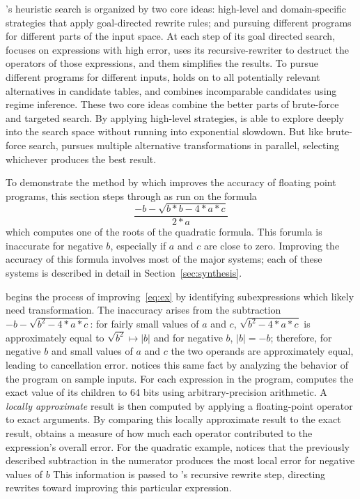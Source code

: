 \documentclass[paper.tex]{subfiles}
\begin{document}
\casio's heuristic search is organized by two core ideas: high-level
and domain-specific strategies that apply goal-directed rewrite rules;
and pursuing different programs for different parts of the input
space.  At each step of its goal directed search, \casio focuses on
expressions with high error, uses its recursive-rewriter to destruct
the operators of those expressions, and them simplifies the results.
To pursue different programs for different inputs, \casio holds on to
all potentially relevant alternatives in candidate tables, and combines
incomparable candidates using regime inference.  These two core ideas
combine the better parts of brute-force and targeted search.  By
applying high-level strategies, \casio is able to explore deeply into
the search space without running into exponential slowdown.  But like
brute-force search, \casio pursues multiple alternative
transformations in parallel, selecting whichever produces the best
result.

To demonstrate the method by which
  \casio improves the accuracy of floating point programs,
  this section steps through \casio as run on the formula
\begin{equation}\label{eq:ex}
  \frac{-b - \sqrt{b*b - 4*a*c}}
       {2*a}
\end{equation}
  which computes one of the roots of the quadratic formula.
This forumla is inaccurate for negative $b$,
  especially if $a$ and $c$ are close to zero.
Improving the accuracy of this formula
  involves most of the major systems;
  each of these systems is described in detail
  in Section~\ref{sec:synthesis}.

\casio begins the process of improving~\eqref{eq:ex}
  by identifying subexpressions
  which likely need transformation.
The inaccuracy arises from the subtraction $-b - \sqrt{b^2 - 4*a*c}$:
  for fairly small values of $a$ and $c$,
  $\sqrt{b^2 - 4*a*c}$ is approximately equal to $\sqrt{b^2} \mapsto |b|$
  and for negative $b$, $|b| = -b$;
  therefore, for negative $b$ and small values of $a$ and $c$
  the two operands are approximately equal,
  leading to cancellation error.
\casio notices this same fact
  by analyzing the behavior of the program on sample inputs.
For each expression in the program,
  \casio computes the exact value of its children to 64 bits
  using arbitrary-precision arithmetic.
A \emph{locally approximate} result is then computed
  by applying a floating-point operator to exact arguments.
By comparing this locally approximate result to the exact result,
  \casio obtains a measure of how much each operator
  contributed to the expression's overall error.
For the quadratic example,
  \casio notices that the previously described subtraction in the numerator 
  produces the most local error for negative values of $b$
This information is passed to \casio's recursive rewrite step,
  directing rewrites toward improving this particular expression.
\end{document}
